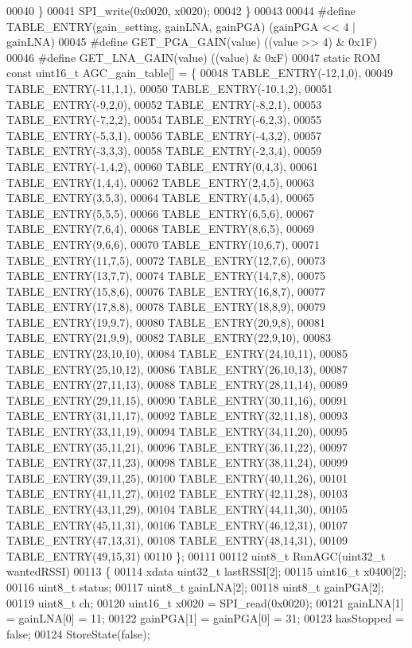 \begin{DoxyCode}
00040     \}
00041     SPI_write(0x0020, x0020);
00042 \}
00043 
00044 \textcolor{preprocessor}{#define TABLE\_ENTRY(gain\_setting, gainLNA, gainPGA) (gainPGA << 4 | gainLNA)}
00045 \textcolor{preprocessor}{#define GET\_PGA\_GAIN(value) ((value >> 4) & 0x1F)}
00046 \textcolor{preprocessor}{#define GET\_LNA\_GAIN(value) ((value) & 0xF)}
00047 \textcolor{keyword}{static} ROM \textcolor{keyword}{const} uint16\_t AGC_gain_table[] = \{
00048 TABLE_ENTRY(-12,1,0),
00049 TABLE_ENTRY(-11,1,1),
00050 TABLE_ENTRY(-10,1,2),
00051 TABLE_ENTRY(-9,2,0),
00052 TABLE_ENTRY(-8,2,1),
00053 TABLE_ENTRY(-7,2,2),
00054 TABLE_ENTRY(-6,2,3),
00055 TABLE_ENTRY(-5,3,1),
00056 TABLE_ENTRY(-4,3,2),
00057 TABLE_ENTRY(-3,3,3),
00058 TABLE_ENTRY(-2,3,4),
00059 TABLE_ENTRY(-1,4,2),
00060 TABLE_ENTRY(0,4,3),
00061 TABLE_ENTRY(1,4,4),
00062 TABLE_ENTRY(2,4,5),
00063 TABLE_ENTRY(3,5,3),
00064 TABLE_ENTRY(4,5,4),
00065 TABLE_ENTRY(5,5,5),
00066 TABLE_ENTRY(6,5,6),
00067 TABLE_ENTRY(7,6,4),
00068 TABLE_ENTRY(8,6,5),
00069 TABLE_ENTRY(9,6,6),
00070 TABLE_ENTRY(10,6,7),
00071 TABLE_ENTRY(11,7,5),
00072 TABLE_ENTRY(12,7,6),
00073 TABLE_ENTRY(13,7,7),
00074 TABLE_ENTRY(14,7,8),
00075 TABLE_ENTRY(15,8,6),
00076 TABLE_ENTRY(16,8,7),
00077 TABLE_ENTRY(17,8,8),
00078 TABLE_ENTRY(18,8,9),
00079 TABLE_ENTRY(19,9,7),
00080 TABLE_ENTRY(20,9,8),
00081 TABLE_ENTRY(21,9,9),
00082 TABLE_ENTRY(22,9,10),
00083 TABLE_ENTRY(23,10,10),
00084 TABLE_ENTRY(24,10,11),
00085 TABLE_ENTRY(25,10,12),
00086 TABLE_ENTRY(26,10,13),
00087 TABLE_ENTRY(27,11,13),
00088 TABLE_ENTRY(28,11,14),
00089 TABLE_ENTRY(29,11,15),
00090 TABLE_ENTRY(30,11,16),
00091 TABLE_ENTRY(31,11,17),
00092 TABLE_ENTRY(32,11,18),
00093 TABLE_ENTRY(33,11,19),
00094 TABLE_ENTRY(34,11,20),
00095 TABLE_ENTRY(35,11,21),
00096 TABLE_ENTRY(36,11,22),
00097 TABLE_ENTRY(37,11,23),
00098 TABLE_ENTRY(38,11,24),
00099 TABLE_ENTRY(39,11,25),
00100 TABLE_ENTRY(40,11,26),
00101 TABLE_ENTRY(41,11,27),
00102 TABLE_ENTRY(42,11,28),
00103 TABLE_ENTRY(43,11,29),
00104 TABLE_ENTRY(44,11,30),
00105 TABLE_ENTRY(45,11,31),
00106 TABLE_ENTRY(46,12,31),
00107 TABLE_ENTRY(47,13,31),
00108 TABLE_ENTRY(48,14,31),
00109 TABLE_ENTRY(49,15,31)
00110 \};
00111 
00112 uint8\_t RunAGC(uint32\_t wantedRSSI)
00113 \{
00114     xdata uint32\_t lastRSSI[2];
00115     uint16\_t x0400[2];
00116     uint8\_t status;
00117     uint8\_t gainLNA[2];
00118     uint8\_t gainPGA[2];
00119     uint8\_t ch;
00120     uint16\_t x0020 = SPI_read(0x0020);
00121     gainLNA[1] = gainLNA[0] = 11;
00122     gainPGA[1] = gainPGA[0] = 31;
00123     hasStopped = \textcolor{keyword}{false};
00124     StoreState(\textcolor{keyword}{false});

\end{DoxyCode}
